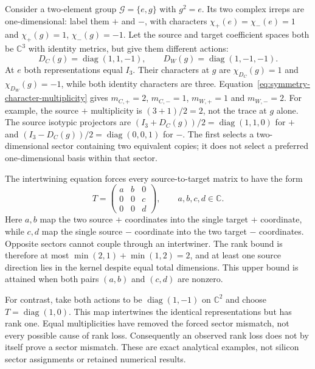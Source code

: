 Consider a two-element group $\mathcal G=\{e,g\}$ with $g^2=e$.
Its two complex irreps are one-dimensional: label them $+$ and $-$, with
characters $\chi_+(e)=\chi_-(e)=1$ and $\chi_+(g)=1$, $\chi_-(g)=-1$.
Let the source and target coefficient spaces both be $\mathbb C^3$ with
identity metrics, but give them different actions:
\begin{equation}
  D_C(g)=\operatorname{diag}(1,1,-1),\qquad
  D_W(g)=\operatorname{diag}(1,-1,-1).
  \label{eq:symmetry-sector-example-actions}
\end{equation}
At $e$ both representations equal $I_3$. Their characters at $g$ are
$\chi_{D_C}(g)=1$ and $\chi_{D_W}(g)=-1$, while both identity characters
are three. Equation~\eqref{eq:symmetry-character-multiplicity} gives
$m_{C,+}=2$, $m_{C,-}=1$, $m_{W,+}=1$ and $m_{W,-}=2$.
For example, the source $+$ multiplicity is $(3+1)/2=2$, not the trace at
$g$ alone. The source isotypic projectors are
$(I_3+D_C(g))/2=\operatorname{diag}(1,1,0)$ for $+$ and
$(I_3-D_C(g))/2=\operatorname{diag}(0,0,1)$ for $-$.
The first selects a two-dimensional sector containing two equivalent copies;
it does not select a preferred one-dimensional basis within that sector.

The intertwining equation forces every source-to-target matrix to have the
form
\begin{equation}
  T=\begin{pmatrix}a&b&0\\0&0&c\\0&0&d\end{pmatrix},
  \qquad a,b,c,d\in\mathbb C.
  \label{eq:symmetry-sector-example-intertwiner}
\end{equation}
Here $a,b$ map the two source $+$ coordinates into the single target $+$
coordinate, while $c,d$ map the single source $-$ coordinate into the two
target $-$ coordinates. Opposite sectors cannot couple through an
intertwiner. The rank bound is therefore at most
$\min(2,1)+\min(1,2)=2$, and at least one source direction lies in the kernel
despite equal total dimensions. This upper bound is attained when both pairs
$(a,b)$ and $(c,d)$ are nonzero.

For contrast, take both actions to be $\operatorname{diag}(1,-1)$ on
$\mathbb C^2$ and choose $T=\operatorname{diag}(1,0)$. This map intertwines
the identical representations but has rank one. Equal multiplicities have
removed the forced sector mismatch, not every possible cause of rank loss.
Consequently an observed rank loss does not by itself prove a sector mismatch.
These are exact analytical examples, not silicon sector assignments or retained
numerical results.

